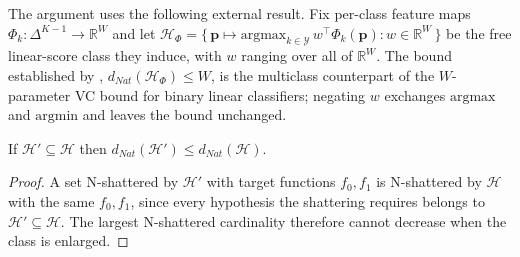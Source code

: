 The argument uses the following external result. Fix per-class feature maps $\Phi_k: \Delta^{K-1} \to \mathbb{R}^{W}$ and let $\mathcal{H}_\Phi = \{\, \mathbf{p} \mapsto \mathrm{argmax}_{k \in \mathcal{Y}}\, w^\top \Phi_k(\mathbf{p}) : w \in \mathbb{R}^{W} \,\}$ be the free linear-score class they induce, with $w$ ranging over all of $\mathbb{R}^{W}$. The bound established by \citet[Theorem~7]{danielyshalev2014optimal}, $d_{Nat}(\mathcal{H}_\Phi) \leq W$, is the multiclass counterpart of the $W$-parameter VC bound for binary linear classifiers; negating $w$ exchanges $\mathrm{argmax}$ and $\mathrm{argmin}$ and leaves the bound unchanged.

\begin{lemma}\label{lem:nat_monotone}
    If $\mathcal{H}' \subseteq \mathcal{H}$ then $d_{Nat}(\mathcal{H}') \leq d_{Nat}(\mathcal{H})$.
\end{lemma}
\begin{proof}
    A set N-shattered by $\mathcal{H}'$ with target functions $f_0, f_1$ is N-shattered by $\mathcal{H}$ with the same $f_0, f_1$, since every hypothesis the shattering requires belongs to $\mathcal{H}' \subseteq \mathcal{H}$. The largest N-shattered cardinality therefore cannot decrease when the class is enlarged.
\end{proof}


